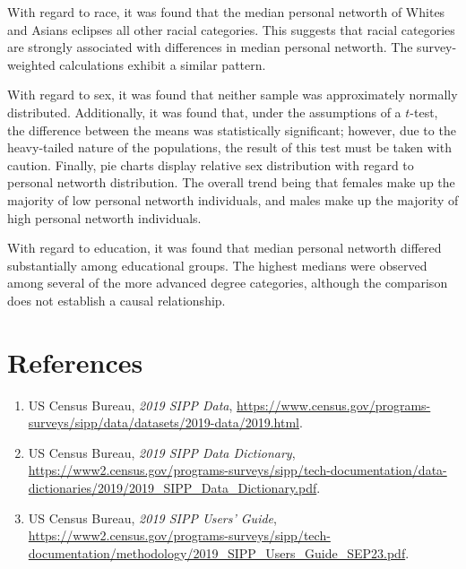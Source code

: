 \documentclass[11pt]{article}
\begin{document}
With regard to race, it was found that the median personal networth of Whites and Asians eclipses all other racial categories. This suggests that racial categories are strongly associated with differences in median personal networth. The survey-weighted calculations exhibit a similar pattern.

With regard to sex, it was found that neither sample was approximately normally distributed. Additionally, it was found that, under the assumptions of a $t$-test, the difference between the means was statistically significant; however, due to the heavy-tailed nature of the populations, the result of this test must be taken with caution. Finally, pie charts display relative sex distribution with regard to personal networth distribution. The overall trend being that females make up the majority of low personal networth individuals, and males make up the majority of high personal networth individuals.

With regard to education, it was found that median personal networth differed substantially among educational groups. The highest medians were observed among several of the more advanced degree categories, although the comparison does not establish a causal relationship.

\section*{References}
\begingroup\sloppy
\begin{enumerate}
\item US Census Bureau, \emph{2019 SIPP Data}, \url{https://www.census.gov/programs-surveys/sipp/data/datasets/2019-data/2019.html}.
\item US Census Bureau, \emph{2019 SIPP Data Dictionary}, \url{https://www2.census.gov/programs-surveys/sipp/tech-documentation/data-dictionaries/2019/2019_SIPP_Data_Dictionary.pdf}.
\item US Census Bureau, \emph{2019 SIPP Users' Guide}, \url{https://www2.census.gov/programs-surveys/sipp/tech-documentation/methodology/2019_SIPP_Users_Guide_SEP23.pdf}.
\end{enumerate}\endgroup
\end{document}
